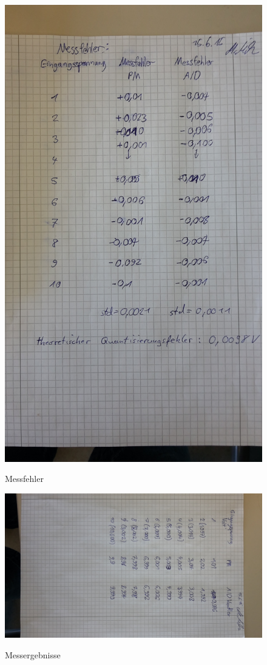 \documentclass[TGAI_Laborbericht.tex]{subfiles}
\begin{document}
\begin{figure}[H]
	\includegraphics[width=1.5\textwidth, angle = -90]{media/Messprotokoll2.jpg}
	\label{Messfehler}
	\caption{Messfehler}
\end{figure}
\begin{figure}[H]
	\includegraphics[width=1.5\textwidth, angle = -90]{media/Messprotokoll3.jpg}
	\label{Messergebnisse}
	\caption{Messergebnisse}
\end{figure}
\end{document}
